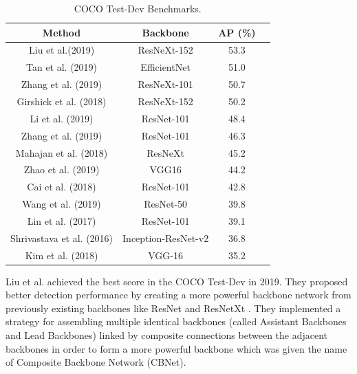 \begin{table}[H]
    
    \centering
    \caption {COCO Test-Dev Benchmarks.}
    \begin{tabular}{| c | c | c | c ||} 
    \hline
    Method & Backbone & AP (\%)  \\ [0.5ex] 
    \hline\hline
    Liu et al.(2019) \cite{Liu2019}  & ResNeXt-152 & 53.3 \\ 
    \hline
    Tan et al. (2019) \cite{Tan2019} & EfficientNet & 51.0 \\
    \hline
    Zhang et al. (2019) \cite{Zhang2019} & ResNeXt-101 & 50.7
    \\
    \hline
    Girshick et al. (2018) \cite{Detectron2018} & ResNeXt-152 & 50.2
    \\
    \hline
    Li et al. (2019) \cite{Li2019} & ResNet-101 & 48.4
    \\ [1ex] 
    \hline
    Zhang et al. (2019) \cite{Zhang2019} & ResNet-101  & 46.3
    \\ [1ex]
    \hline
    Mahajan et al. (2018) \cite{Mahajan2018} & ResNeXt & 45.2
    \\ [1ex]
    \hline
    Zhao et al. (2019) \cite{Zhao2019} & VGG16 & 44.2
    \\ [1ex]
    \hline
    Cai et al. (2018) \cite{Cai2018} & ResNet-101 & 42.8
    \\ [1ex]
    \hline
    Wang et al. (2019) \cite{Wang2019} & ResNet-50    & 39.8
    \\ [1ex]
    \hline
    Lin et al. (2017) \cite{Lin2017} & ResNet-101 & 39.1
    \\ [1ex]
    \hline
    Shrivastava et al. (2016) \cite{shrivastava2016skip} & Inception-ResNet-v2 & 36.8
    \\ [1ex]
    \hline
    Kim et al. (2018) \cite{Kim2018} & VGG-16 & 35.2
    \\ [1ex]
    \hline
   \end{tabular}
   \label{table:cocotable}
\end{table}

\par Liu et al. \cite{Liu2019} achieved the best score in the COCO Test-Dev in 2019. They proposed better detection performance by creating a more powerful backbone network from previously existing backbones like ResNet \cite{He2016} and ResNetXt \cite{Xie2017}. They implemented a strategy for assembling multiple identical backbones (called Assistant Backbones and Lead Backbones) linked by composite connections between the adjacent backbones in order to form a more powerful backbone which was given the name of Composite Backbone Network (CBNet).

